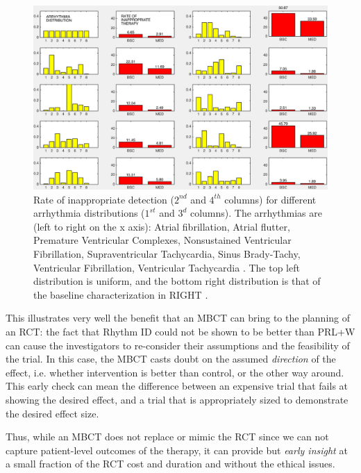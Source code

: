 \begin{figure}[t]
\centering
\includegraphics[scale=0.4]{figures/popvar9}
\caption{\small Rate of inappropriate detection ($2^{nd}$ and $4^{th}$ columns) for different arrhythmia distributions ($1^{st}$ and $3^d$ columns). The arrhythmias are (left to right on the x axis): Atrial fibrillation, Atrial flutter, Premature Ventricular Complexes, Nonsustained Ventricular Fibrillation, Supraventricular Tachycardia, Sinus Brady-Tachy, Ventricular Fibrillation, Ventricular Tachycardia \cite{josephson}. The top left distribution is uniform, and the bottom right distribution is that of the baseline characterization in RIGHT \cite{GoldABBTB11_RIGHTresults}.}
\label{fig:popvar8}
\end{figure}

This illustrates very well the benefit that an MBCT can bring to the planning of an RCT: the fact that Rhythm ID could not be shown to be better than PRL+W %
can cause the investigators to re-consider their assumptions and the feasibility of the trial.
In this case, the MBCT casts doubt on the assumed \emph{direction} of the effect, i.e. whether intervention is better than control, or the other way around.
This early check can mean the difference between an expensive trial that fails at showing the desired effect, and a trial that is appropriately sized to demonstrate the desired effect size.

Thus, while an MBCT does not replace or mimic the RCT since we can not capture patient-level outcomes of the therapy, it can provide  but \emph{early insight} at a small fraction of the RCT cost and duration and without the ethical issues.	 

